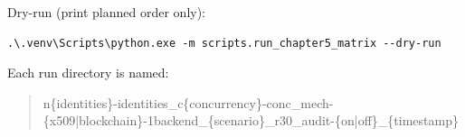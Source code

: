 Dry-run (print planned order only):
\begin{lstlisting}[style=powershell,numbers=none]
.\.venv\Scripts\python.exe -m scripts.run_chapter5_matrix --dry-run
\end{lstlisting}

Each run directory is named:
\begin{quote}
\small\ttfamily
n\{identities\}-identities\_c\{concurrency\}-conc\_mech-\{x509|blockchain\}-1backend\_\{scenario\}\_r30\_audit-\{on|off\}\_\{timestamp\}
\end{quote}
